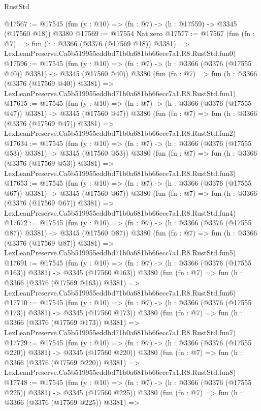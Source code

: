 \begin{lexlean}{RustStd}
\begin{coremodule}
@17567 := @17545 (fun (y : @10) => (fn : @7) -> (h : @17559) -> @3345 (@17560 @18)) @3380
@17569 := @17554 Nat.zero
@17577 := @17567
    (fun (fn : @7) =>
    fun (h : @3366 (@3376 (@17569 @18)) @3381) =>
    LexLeanPreserve.Ca5b519955eddbd71b0a681bb66ecc7a1.R8.RustStd.fun0)
@17596 := @17545
    (fun (y : @10) => (fn : @7) -> (h : @3366 (@3376 (@17555 @40)) @3381) -> @3345 (@17560 @40))
    @3380
    (fun (fn : @7) =>
    fun (h : @3366 (@3376 (@17569 @40)) @3381) =>
    LexLeanPreserve.Ca5b519955eddbd71b0a681bb66ecc7a1.R8.RustStd.fun1)
@17615 := @17545
    (fun (y : @10) => (fn : @7) -> (h : @3366 (@3376 (@17555 @47)) @3381) -> @3345 (@17560 @47))
    @3380
    (fun (fn : @7) =>
    fun (h : @3366 (@3376 (@17569 @47)) @3381) =>
    LexLeanPreserve.Ca5b519955eddbd71b0a681bb66ecc7a1.R8.RustStd.fun2)
@17634 := @17545
    (fun (y : @10) => (fn : @7) -> (h : @3366 (@3376 (@17555 @53)) @3381) -> @3345 (@17560 @53))
    @3380
    (fun (fn : @7) =>
    fun (h : @3366 (@3376 (@17569 @53)) @3381) =>
    LexLeanPreserve.Ca5b519955eddbd71b0a681bb66ecc7a1.R8.RustStd.fun3)
@17653 := @17545
    (fun (y : @10) => (fn : @7) -> (h : @3366 (@3376 (@17555 @67)) @3381) -> @3345 (@17560 @67))
    @3380
    (fun (fn : @7) =>
    fun (h : @3366 (@3376 (@17569 @67)) @3381) =>
    LexLeanPreserve.Ca5b519955eddbd71b0a681bb66ecc7a1.R8.RustStd.fun4)
@17672 := @17545
    (fun (y : @10) => (fn : @7) -> (h : @3366 (@3376 (@17555 @87)) @3381) -> @3345 (@17560 @87))
    @3380
    (fun (fn : @7) =>
    fun (h : @3366 (@3376 (@17569 @87)) @3381) =>
    LexLeanPreserve.Ca5b519955eddbd71b0a681bb66ecc7a1.R8.RustStd.fun5)
@17691 := @17545
    (fun (y : @10) => (fn : @7) -> (h : @3366 (@3376 (@17555 @163)) @3381) -> @3345 (@17560 @163))
    @3380
    (fun (fn : @7) =>
    fun (h : @3366 (@3376 (@17569 @163)) @3381) =>
    LexLeanPreserve.Ca5b519955eddbd71b0a681bb66ecc7a1.R8.RustStd.fun6)
@17710 := @17545
    (fun (y : @10) => (fn : @7) -> (h : @3366 (@3376 (@17555 @173)) @3381) -> @3345 (@17560 @173))
    @3380
    (fun (fn : @7) =>
    fun (h : @3366 (@3376 (@17569 @173)) @3381) =>
    LexLeanPreserve.Ca5b519955eddbd71b0a681bb66ecc7a1.R8.RustStd.fun7)
@17729 := @17545
    (fun (y : @10) => (fn : @7) -> (h : @3366 (@3376 (@17555 @220)) @3381) -> @3345 (@17560 @220))
    @3380
    (fun (fn : @7) =>
    fun (h : @3366 (@3376 (@17569 @220)) @3381) =>
    LexLeanPreserve.Ca5b519955eddbd71b0a681bb66ecc7a1.R8.RustStd.fun8)
@17748 := @17545
    (fun (y : @10) => (fn : @7) -> (h : @3366 (@3376 (@17555 @225)) @3381) -> @3345 (@17560 @225))
    @3380
    (fun (fn : @7) =>
    fun (h : @3366 (@3376 (@17569 @225)) @3381) =>

\end{coremodule}
\end{lexlean}
